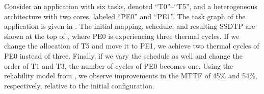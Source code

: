 Consider an application with six tasks, denoted ``T0''--``T5'', and a heterogeneous architecture with two cores, labeled ``PE0'' and ``PE1''. The task graph of the application is given in . The initial mapping, schedule, and resulting SSDTP are shown at the top of , where PE0 is experiencing three thermal cycles. If we change the allocation of T5 and move it to PE1, we achieve two thermal cycles of PE0 instead of three. Finally, if we vary the schedule as well and change the order of T1 and T3, the number of cycles of PE0 becomes one. Using the reliability model from , we observe improvements in the MTTF of 45\% and 54\%, respectively, relative to the initial configuration.
